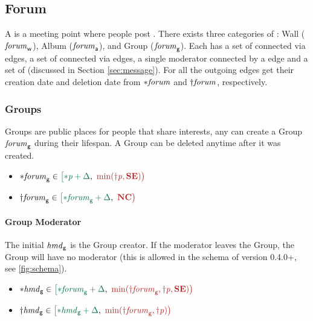 \subsection{Forum}
\label{sec:forum}
\label{sec:hasModerator}

A \tForum is a meeting point where people post \tMessages.
There exists three categories of \tForums:
Wall ($\mathit{forum}_\textsf{w}$),
Album ($\mathit{forum}_\textsf{a}$),
and Group ($\mathit{forum}_\textsf{g}$).
Each \tForum has a set of \tPersons connected via \tHasMember edges, a set of \tTags connected via \tHasTag edges, a single moderator connected by a \tHasModerator edge and a set of \tMessages (discussed in Section \ref{sec:message}).
For all \tForums the outgoing \tHasTag edges get their creation date and deletion date from ${\ast}\mathit{\mathit{forum}}$ and ${\dagger}\mathit{\mathit{forum}}$, respectively.

\subsubsection{Groups}
Groups are public places for people that share interests, any \tPerson can create a Group $\mathit{forum}_\textsf{g}$ during their lifespan. A Group can be deleted anytime after it was created.
\begin{itemize}
    \item $\varc{\eForum}_{\mathsf{g}} \in \interval{\varc{\ePerson} + \Delta}{\min (\vard{\ePerson}, \xSE)}$
    \item $\vard{\eForum}_{\mathsf{g}} \in \interval{\varc{\eForum}_{\mathsf{g}} + \Delta}{\xNC}$
\end{itemize}

\paragraph{Group Moderator}
The initial \tHasModerator $\mathit{hmd}_{\mathsf{g}}$ is the Group creator. If the moderator leaves the Group, the Group will have no moderator (this is allowed in the schema of version 0.4.0+, see \autoref{fig:schema}).
\begin{itemize}
\item $\varc{\eHasModerator}_{\mathsf{g}} \in \interval{\varc{\eForum}_{\mathsf{g}} + \Delta}{\min (\vard{\eForum}_{\mathsf{g}}, \vard{\ePerson}, \xSE)}$
\item $\vard{\eHasModerator}_{\mathsf{g}} \in \interval{ \varc{\eHasModerator}_{\mathsf{g}} + \Delta}{\min (\vard{\eForum}_{\mathsf{g}}, \vard{\ePerson})}$
\end{itemize}

